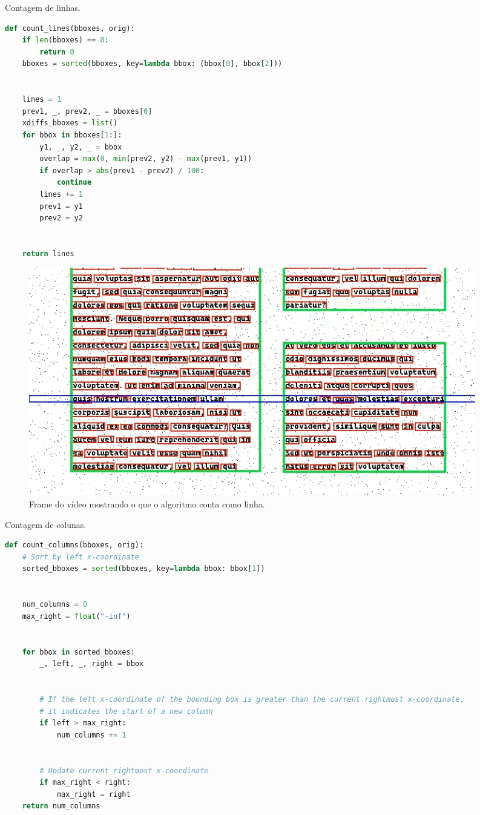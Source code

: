 \documentclass[english, 
               brazil, 
               bsc] %
               {dcomp-abntex2}
\begin{document}
\begin{codigo}[h]
  \caption{\small Contagem de linhas.}
 \label{cod-linecount}
\begin{lstlisting}[language=python]
def count_lines(bboxes, orig):
    if len(bboxes) == 0:
        return 0
    bboxes = sorted(bboxes, key=lambda bbox: (bbox[0], bbox[2]))


    lines = 1
    prev1, _, prev2, _ = bboxes[0]
    xdiffs_bboxes = list()
    for bbox in bboxes[1:]:
        y1, _, y2, _ = bbox
        overlap = max(0, min(prev2, y2) - max(prev1, y1))
        if overlap > abs(prev1 - prev2) / 100:
            continue
        lines += 1
        prev1 = y1
        prev2 = y2


    return lines
\end{lstlisting}
\end{codigo}




\begin{figure}[htb]
        \caption{\label{fig-linecount} \small Frame do vídeo mostrando o que o algoritmo conta como linha. }
        \begin{center}
            \includegraphics[scale=0.55]{./images/cascadia_line.png}
        \end{center}
\end{figure}


\begin{codigo}[h]
  \caption{\small Contagem de colunas.}
 \label{cod-columncount}
\begin{lstlisting}[language=python]
def count_columns(bboxes, orig):
    # Sort by left x-coordinate
    sorted_bboxes = sorted(bboxes, key=lambda bbox: bbox[1])


    num_columns = 0
    max_right = float("-inf")


    for bbox in sorted_bboxes:
        _, left, _, right = bbox


        # If the left x-coordinate of the bounding box is greater than the current rightmost x-coordinate,
        # it indicates the start of a new column
        if left > max_right:
            num_columns += 1


        # Update current rightmost x-coordinate
        if max_right < right:
            max_right = right
    return num_columns
\end{lstlisting}
\end{codigo}
\end{document}
